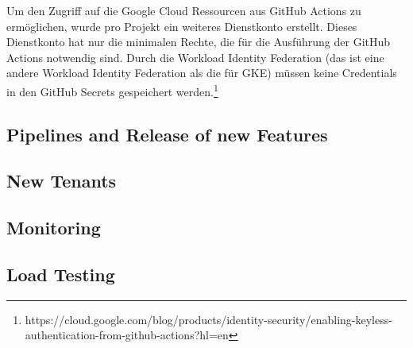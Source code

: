 Um den Zugriff auf die Google Cloud Ressourcen aus GitHub Actions zu ermöglichen,
wurde pro Projekt ein weiteres Dienstkonto erstellt. Dieses Dienstkonto hat nur die minimalen Rechte,
die für die Ausführung der GitHub Actions notwendig sind. Durch die \glqq{}Workload Identity Federation\grqq{}
(das ist eine andere Workload Identity Federation als die für GKE) müssen keine Credentials
in den GitHub Secrets gespeichert werden.\footnote{https://cloud.google.com/blog/products/identity-security/enabling-keyless-authentication-from-github-actions?hl=en}

\subsection{Pipelines and Release of new Features}

\subsection{New Tenants}
\subsection{Monitoring}
\subsection{Load Testing}